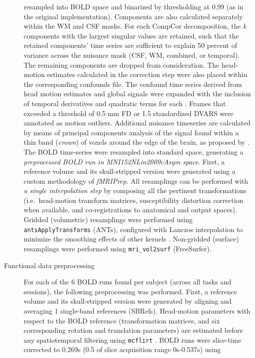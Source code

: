 \documentclass[
]{article}
\begin{document}
\begin{description}
resampled into BOLD space and binarized by thresholding at 0.99 (as in
the original implementation). Components are also calculated separately
within the WM and CSF masks. For each CompCor decomposition, the
\emph{k} components with the largest singular values are retained, such
that the retained components' time series are sufficient to explain 50
percent of variance across the nuisance mask (CSF, WM, combined, or
temporal). The remaining components are dropped from consideration. The
head-motion estimates calculated in the correction step were also placed
within the corresponding confounds file. The confound time series
derived from head motion estimates and global signals were expanded with
the inclusion of temporal derivatives and quadratic terms for each
\citep{confounds_satterthwaite_2013}. Frames that exceeded a threshold
of 0.5 mm FD or 1.5 standardized DVARS were annotated as motion
outliers. Additional nuisance timeseries are calculated by means of
principal components analysis of the signal found within a thin band
(\emph{crown}) of voxels around the edge of the brain, as proposed by
\citep{patriat_improved_2017}. The BOLD time-series were resampled into
standard space, generating a \emph{preprocessed BOLD run in
MNI152NLin2009cAsym space}. First, a reference volume and its
skull-stripped version were generated using a custom methodology of
\emph{fMRIPrep}. All resamplings can be performed with \emph{a single
interpolation step} by composing all the pertinent transformations
(i.e.~head-motion transform matrices, susceptibility distortion
correction when available, and co-registrations to anatomical and output
spaces). Gridded (volumetric) resamplings were performed using
\texttt{antsApplyTransforms} (ANTs), configured with Lanczos
interpolation to minimize the smoothing effects of other kernels
\citep{lanczos}. Non-gridded (surface) resamplings were performed using
\texttt{mri\_vol2surf} (FreeSurfer).
\item[Functional data preprocessing]
For each of the 6 BOLD runs found per subject (across all tasks and
sessions), the following preprocessing was performed. First, a reference
volume and its skull-stripped version were generated by aligning and
averaging 1 single-band references (SBRefs). Head-motion parameters with
respect to the BOLD reference (transformation matrices, and six
corresponding rotation and translation parameters) are estimated before
any spatiotemporal filtering using \texttt{mcflirt} \citep[FSL
6.0.5.1:57b01774,][]{mcflirt}. BOLD runs were slice-time corrected to
0.269s (0.5 of slice acquisition range 0s-0.537s) using

\end{description}
\end{document}
